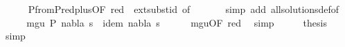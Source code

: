 \begin{isabellebody}
\ \ \ \ \isamarkupfalse%
\ P{}{\isacharunderscore}{\kern0pt}from{\isacharunderscore}{\kern0pt}P{}{\isacharunderscore}{\kern0pt}red{\isacharunderscore}{\kern0pt}plus{\isacharbrackleft}{\kern0pt}OF\ red\ {\isacharunderscore}{\kern0pt}\ ext{\isacharunderscore}{\kern0pt}subst{\isacharunderscore}{\kern0pt}id{\isacharcomma}{\kern0pt}\ of\ {\isachardoublequoteopen}{\isacharbraceleft}{\kern0pt}{\isacharbraceright}{\kern0pt}{\isachardoublequoteclose}{\isacharbrackright}{\kern0pt}\isanewline
\ \ \ \ \isamarkupfalse%
\ {\isacharparenleft}{\kern0pt}simp\ add{\isacharcolon}{\kern0pt}\ all{\isacharunderscore}{\kern0pt}solutions{\isacharunderscore}{\kern0pt}def{\isacharbrackleft}{\kern0pt}of\ {\isachardoublequoteopen}{\isacharparenleft}{\kern0pt}{\isacharbrackleft}{\kern0pt}{\isacharbrackright}{\kern0pt}{\isacharcomma}{\kern0pt}{\isacharbrackleft}{\kern0pt}{\isacharbrackright}{\kern0pt}{\isacharparenright}{\kern0pt}{\isachardoublequoteclose}{\isacharbrackright}{\kern0pt}{\isacharparenright}{\kern0pt}\isanewline
\ \ \isamarkupfalse%
\ \isamarkupfalse%
\ {\isachardoublequoteopen}mgu\ P\ {\isacharparenleft}{\kern0pt}nabla{\isacharcomma}{\kern0pt}\ s{\isacharparenright}{\kern0pt}\ {\isasymand}\ idem\ {\isacharparenleft}{\kern0pt}nabla{\isacharcomma}{\kern0pt}\ s{\isacharparenright}{\kern0pt}{\isachardoublequoteclose}\isanewline
\ \ \ \ \isamarkupfalse%
\ mgu{\isacharbrackleft}{\kern0pt}OF\ red{\isacharbrackright}{\kern0pt}\ \isamarkupfalse%
\ simp\isanewline
\ \ \isamarkupfalse%
\ \isamarkupfalse%
\ {\isacharquery}{\kern0pt}thesis\ \isamarkupfalse%
\ simp\isanewline
{}\isamarkupfalse%
%
\endisatagproof
{\isafoldproof}%
%
\isadelimproof
\isanewline
%
\endisadelimproof
%
\isadelimtheory
%
\endisadelimtheory
%
\isatagtheory
%
\endisatagtheory
{\isafoldtheory}%
%
\isadelimtheory
%
\endisadelimtheory
%
\end{isabellebody}%
\endinput
